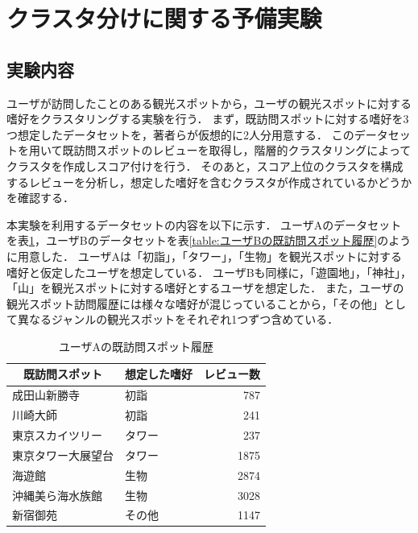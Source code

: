 \documentclass{deimj}
\begin{document}
\section{クラスタ分けに関する予備実験}
\subsection{実験内容}
ユーザが訪問したことのある観光スポットから，ユーザの観光スポットに対する嗜好をクラスタリングする実験を行う．
まず，既訪問スポットに対する嗜好を3つ想定したデータセットを，著者らが仮想的に2人分用意する．
このデータセットを用いて既訪問スポットのレビューを取得し，階層的クラスタリングによってクラスタを作成しスコア付けを行う．
そのあと，スコア上位のクラスタを構成するレビューを分析し，想定した嗜好を含むクラスタが作成されているかどうかを確認する．

本実験を利用するデータセットの内容を以下に示す．
ユーザAのデータセットを表\ref{table:ユーザAの既訪問スポット履歴}，ユーザBのデータセットを表\ref{table:ユーザBの既訪問スポット履歴}のように用意した．
ユーザAは「初詣」，「タワー」，「生物」を観光スポットに対する嗜好と仮定したユーザを想定している．
ユーザBも同様に，「遊園地」，「神社」，「山」を観光スポットに対する嗜好とするユーザを想定した．
また，ユーザの観光スポット訪問履歴には様々な嗜好が混じっていることから，「その他」として異なるジャンルの観光スポットをそれぞれ1つずつ含めている．

\begin{table}[t]
    \caption{ユーザAの既訪問スポット履歴}
    \label{table:ユーザAの既訪問スポット履歴}
    \centering
    \begin{tabular}{l|l|r}
    \hline
    \multicolumn{1}{c|}{既訪問スポット} & \multicolumn{1}{c|}{想定した嗜好} & \multicolumn{1}{c}{レビュー数} \\ \hline
    成田山新勝寺                       & 初詣                          & 787                       \\
    川崎大師                         & 初詣                          & 241                       \\
    東京スカイツリー                     & タワー                         & 237                       \\
    東京タワー大展望台                    & タワー                         & 1875                      \\
    海遊館                          & 生物                          & 2874                      \\
    沖縄美ら海水族館                     & 生物                          & 3028                      \\
    新宿御苑                         & その他                         & 1147                      \\ \hline
    \end{tabular}
\end{table}
\end{document}
